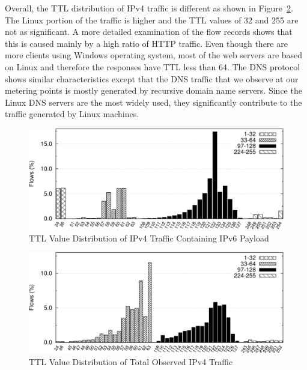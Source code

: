 Overall, the TTL distribution of IPv4 traffic is different as shown in Figure~\ref{fig:ipv6-tunnels-ipv4-ttl4}. The Linux portion of the traffic is higher and the TTL values of 32 and 255 are not as significant. A more detailed examination of the flow records shows that this is caused mainly by a high ratio of HTTP traffic. Even though there are more clients using Windows operating system, most of the web servers are based on Linux and therefore the responses have TTL less than 64. The DNS protocol shows similar characteristics except that the DNS traffic that we observe at our metering points is mostly generated by recursive domain name servers. Since the Linux DNS servers are the most widely used, they significantly contribute to the traffic generated by Linux machines.

\begin{figure}[!tb]
    \includegraphics[width=1.00\linewidth]{figures/paper-tunnels/ttl/ttl}
    \caption{TTL Value Distribution of IPv4 Traffic Containing IPv6 Payload}
    \label{fig:ipv6-tunnels-ipv4-ttl}
\end{figure}

\begin{figure}[!tb]
    \includegraphics[width=1.0\linewidth]{figures/paper-tunnels/ttl/ttl4}
    \caption{TTL Value Distribution of Total Observed IPv4 Traffic}
    \label{fig:ipv6-tunnels-ipv4-ttl4}
\end{figure}


